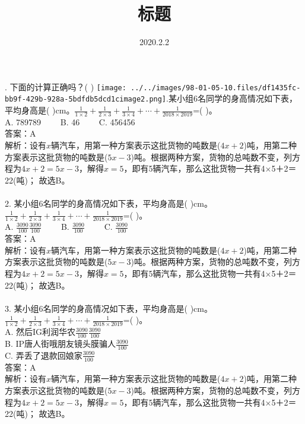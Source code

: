 \documentclass [UTF8]{ctexart}
\begin{document}
\title{标题}
\date{2020.2.2}
. 下面的计算正确吗？(  ) \quad\texttt{[image: ../../images/98-01-05-10.files/df1435fc-bb9f-429b-928a-5bdfdb5dcd1cimage2.png]}.某小组6名同学的身高情况如下表，平均身高是( )cm。\( \displaystyle \frac{1}{1\times 2}+\frac{1}{2\times 3}+\frac{1}{3\times 4}+\cdots +\frac{1}{2018\times 2019}\)=( )。\\
A. 789789　　 B. 46　　 C. 456456　　 \\
答案：A\\
解析：设有\( x\)辆汽车，用第一种方案表示这批货物的吨数是(\( 4x+2\))吨，用第二种方案表示这批货物的吨数是(\( 5x-3\))吨。根据两种方案，货物的总吨数不变，列方程为\( 4x+2=5x-3\)，解得\( x=5\)，即有5辆汽车，那么这批货物一共有4×5＋2＝22(吨)； 故选B。\\
\\
2. 某小组6名同学的身高情况如下表，平均身高是( )cm。\( \displaystyle \frac{1}{1\times 2}+\frac{1}{2\times 3}+\frac{1}{3\times 4}+\cdots +\frac{1}{2018\times 2019}\)=( )。\\
A. \( \frac{3090}{100}\)\( \frac{3090}{100}\)　　 B. \( \frac{3090}{100}\)　　 C. \( \frac{3090}{100}\)　　 \\
答案：A\\
解析：设有\( x\)辆汽车，用第一种方案表示这批货物的吨数是(\( 4x+2\))吨，用第二种方案表示这批货物的吨数是(\( 5x-3\))吨。根据两种方案，货物的总吨数不变，列方程为\( 4x+2=5x-3\)，解得\( x=5\)，即有5辆汽车，那么这批货物一共有4×5＋2＝22(吨)； 故选B。\\
\\
3. 某小组6名同学的身高情况如下表，平均身高是( )cm。\( \displaystyle \frac{1}{1\times 2}+\frac{1}{2\times 3}+\frac{1}{3\times 4}+\cdots +\frac{1}{2018\times 2019}\)=( )。\\
A. 然后IG利润华农\( \frac{3090}{100}\)\( \frac{3090}{100}\)　　 \\
B. IP唐人街哦朋友镜头膜骗人\( \frac{3090}{100}\)　　 \\
C. 弄丢了退款回娘家\( \frac{3090}{100}\)　　 \\
答案：A\\
解析：设有\( x\)辆汽车，用第一种方案表示这批货物的吨数是(\( 4x+2\))吨，用第二种方案表示这批货物的吨数是(\( 5x-3\))吨。根据两种方案，货物的总吨数不变，列方程为\( 4x+2=5x-3\)，解得\( x=5\)，即有5辆汽车，那么这批货物一共有4×5＋2＝22(吨)； 故选B。\\
\\
 
\end{document}
